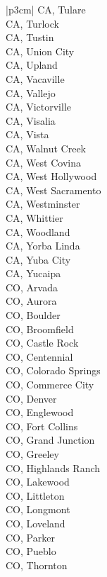 \begin{customLongTable}{ |p{3cm}| }
CA, Tulare \\ \hline
CA, Turlock \\ \hline
CA, Tustin \\ \hline
CA, Union City \\ \hline
CA, Upland \\ \hline
CA, Vacaville \\ \hline
CA, Vallejo \\ \hline
CA, Victorville \\ \hline
CA, Visalia \\ \hline
CA, Vista \\ \hline
CA, Walnut Creek \\ \hline
CA, West Covina \\ \hline
CA, West Hollywood \\ \hline
CA, West Sacramento \\ \hline
CA, Westminster \\ \hline
CA, Whittier \\ \hline
CA, Woodland \\ \hline
CA, Yorba Linda \\ \hline
CA, Yuba City \\ \hline
CA, Yucaipa \\ \hline
CO, Arvada \\ \hline
CO, Aurora \\ \hline
CO, Boulder \\ \hline
CO, Broomfield \\ \hline
CO, Castle Rock \\ \hline
CO, Centennial \\ \hline
CO, Colorado Springs \\ \hline
CO, Commerce City \\ \hline
CO, Denver \\ \hline
CO, Englewood \\ \hline
CO, Fort Collins \\ \hline
CO, Grand Junction \\ \hline
CO, Greeley \\ \hline
CO, Highlands Ranch \\ \hline
CO, Lakewood \\ \hline
CO, Littleton \\ \hline
CO, Longmont \\ \hline
CO, Loveland \\ \hline
CO, Parker \\ \hline
CO, Pueblo \\ \hline
CO, Thornton \\ \hline

\end{customLongTable}
